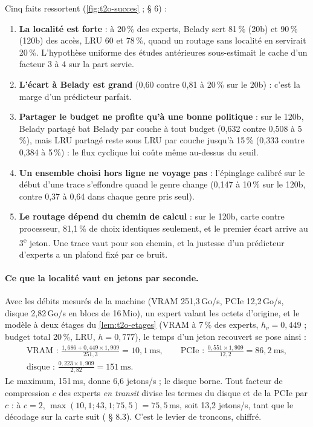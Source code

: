 Cinq faits ressortent (\cref{fig:t2o-succes} ;  § 6) :
\begin{enumerate}
\item \textbf{La localité est forte} : à 20\,\% des experts, Belady sert 81\,\% (20b) et 90\,\% (120b) des accès, LRU 60 et 78\,\%, quand un routage sans localité en servirait 20\,\%. L'hypothèse uniforme des études antérieures sous-estimait le cache d'un facteur 3 à 4 sur la part servie.
\item \textbf{L'écart à Belady est grand} (0,60 contre 0,81 à 20\,\% sur le 20b) : c'est la marge d'un prédicteur parfait.
\item \textbf{Partager le budget ne profite qu'à une bonne politique} : sur le 120b, Belady partagé bat Belady par couche à tout budget (0,632 contre 0,508 à 5\,\%), mais LRU partagé reste sous LRU par couche jusqu'à 15\,\% (0,333 contre 0,384 à 5\,\%) : le flux cyclique lui coûte même au-dessus du seuil.
\item \textbf{Un ensemble choisi hors ligne ne voyage pas} : l'épinglage calibré sur le début d'une trace s'effondre quand le genre change (0,147 à 10\,\% sur le 120b, contre 0,37 à 0,64 dans chaque genre pris seul).
\item \textbf{Le routage dépend du chemin de calcul} : sur le 120b, carte contre processeur, 81,1\,\% de choix identiques seulement, et le premier écart arrive au 3\textsuperscript{e} jeton. Une trace vaut pour son chemin, et la justesse d'un prédicteur d'experts a un plafond fixé par ce bruit.
\end{enumerate}

\paragraph{Ce que la localité vaut en jetons par seconde.} Avec les débits mesurés de la machine (VRAM 251,3\,Go/s, PCIe 12,2\,Go/s, disque 2,82\,Go/s en blocs de 16\,Mio), un expert valant les octets d'origine, et le modèle à deux étages du \cref{lem:t2o-etages} (VRAM à 7\,\% des experts, $h_v = 0{,}449$ ; budget total 20\,\%, LRU, $h = 0{,}777$), le temps d'un jeton recouvert se pose ainsi \calc :
\begin{gather*}
\text{VRAM : } \frac{1{,}686 + 0{,}449 \times 1{,}909}{251{,}3} = 10{,}1~\text{ms}, \qquad
\text{PCIe : } \frac{0{,}551 \times 1{,}909}{12{,}2} = 86{,}2~\text{ms}, \\
\text{disque : } \frac{0{,}223 \times 1{,}909}{2{,}82} = 151~\text{ms}.
\end{gather*}
Le maximum, 151\,ms, donne 6,6 jetons/s ; le disque borne. Tout facteur de compression $c$ des experts \emph{en transit} divise les termes du disque et de la PCIe par $c$ : à $c = 2$, $\max(10{,}1 ; 43{,}1 ; 75{,}5) = 75{,}5$\,ms, soit 13,2 jetons/s, tant que le décodage sur la carte suit ( § 8.3). C'est le levier de troncons, chiffré.

